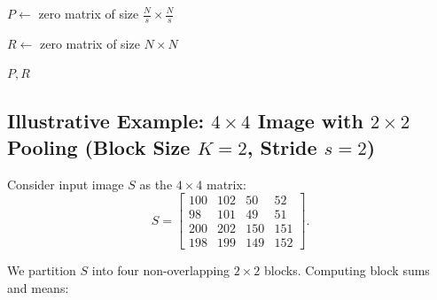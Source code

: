 \begin{algorithm}[H]
\caption{Average Pooling}
\label{alg:avg_pooling}
\LinesNumbered


$P \gets$ zero matrix of size $\frac{N}{s} \times \frac{N}{s}$

$R \gets$ zero matrix of size $N \times N$

\vspace{4pt}

\Return $P, R$
\end{algorithm}

\subsection*{Illustrative Example: $4\times4$ Image with $2\times2$ Pooling (Block Size $K=2$, Stride $s=2$)}

Consider input image \(S\) as the \(4\times4\) matrix:
\begin{equation}
S =
\begin{bmatrix}
100 & 102 & 50 & 52 \\
98  & 101 & 49 & 51 \\
200 & 202 & 150 & 151 \\
198 & 199 & 149 & 152
\end{bmatrix}.
\end{equation}

We partition \(S\) into four non-overlapping \(2\times2\) blocks. Computing block sums and means:

